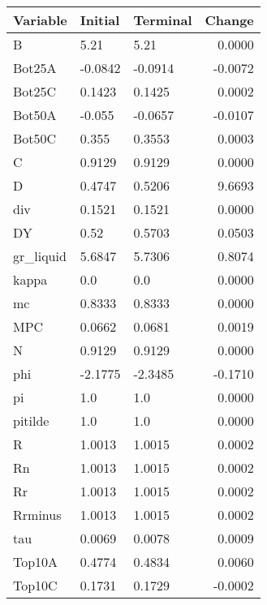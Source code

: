 \begin{table}
\centering
\label{tab:stst_comparison_no_ZLB_limit_permanent_asymmetric}
\begin{tabular}{lllr}
\toprule
                Variable & Initial & Terminal &  Change \\
\midrule
                       B &    5.21 &     5.21 &  0.0000 \\
                  Bot25A & -0.0842 &  -0.0914 & -0.0072 \\
                  Bot25C &  0.1423 &   0.1425 &  0.0002 \\
                  Bot50A &  -0.055 &  -0.0657 & -0.0107 \\
                  Bot50C &   0.355 &   0.3553 &  0.0003 \\
                       C &  0.9129 &   0.9129 &  0.0000 \\
                       D &  0.4747 &   0.5206 &  9.6693 \\
                     div &  0.1521 &   0.1521 &  0.0000 \\
                      DY &    0.52 &   0.5703 &  0.0503 \\
               gr\_liquid &  5.6847 &   5.7306 &  0.8074 \\
                   kappa &     0.0 &      0.0 &  0.0000 \\
                      mc &  0.8333 &   0.8333 &  0.0000 \\
                     MPC &  0.0662 &   0.0681 &  0.0019 \\
                       N &  0.9129 &   0.9129 &  0.0000 \\
                     phi & -2.1775 &  -2.3485 & -0.1710 \\
                      pi &     1.0 &      1.0 &  0.0000 \\
                 pitilde &     1.0 &      1.0 &  0.0000 \\
                       R &  1.0013 &   1.0015 &  0.0002 \\
                      Rn &  1.0013 &   1.0015 &  0.0002 \\
                      Rr &  1.0013 &   1.0015 &  0.0002 \\
                 Rrminus &  1.0013 &   1.0015 &  0.0002 \\
                     tau &  0.0069 &   0.0078 &  0.0009 \\
                  Top10A &  0.4774 &   0.4834 &  0.0060 \\
                  Top10C &  0.1731 &   0.1729 & -0.0002 \\

\end{tabular}
\end{table}
